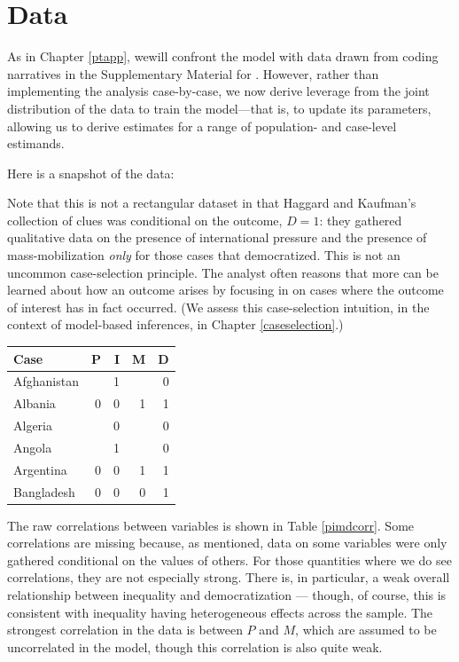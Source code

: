 \documentclass[
  12pt,
]{book}
\begin{document}
\hypertarget{data}{%
\section{Data}\label{data}}

As in Chapter \ref{ptapp}, wewill confront the model with data drawn from coding narratives in the Supplementary Material for \citet{haggard2012inequality}. However, rather than implementing the analysis case-by-case, we now derive leverage from the joint distribution of the data to train the model---that is, to update its parameters, allowing us to derive estimates for a range of population- and case-level estimands.

Here is a snapshot of the data:

Note that this is not a rectangular dataset in that Haggard and Kaufman's collection of clues was conditional on the outcome, \(D=1\): they gathered qualitative data on the presence of international pressure and the presence of mass-mobilization \emph{only} for those cases that democratized. This is not an uncommon case-selection principle. The analyst often reasons that more can be learned about how an outcome arises by focusing in on cases where the outcome of interest has in fact occurred. (We assess this case-selection intuition, in the context of model-based inferences, in Chapter \ref{caseselection}.)

\begin{tabular}{l|r|r|r|r}
\hline
Case & P & I & M & D\\
\hline
Afghanistan &  & 1 &  & 0\\
\hline
Albania & 0 & 0 & 1 & 1\\
\hline
Algeria &  & 0 &  & 0\\
\hline
Angola &  & 1 &  & 0\\
\hline
Argentina & 0 & 0 & 1 & 1\\
\hline
Bangladesh & 0 & 0 & 0 & 1\\
\hline
\end{tabular}

The raw correlations between variables is shown in Table \ref{pimdcorr}. Some correlations are missing because, as mentioned, data on some variables were only gathered conditional on the values of others. For those quantities where we do see correlations, they are not especially strong. There is, in particular, a weak overall relationship between inequality and democratization --- though, of course, this is consistent with inequality having heterogeneous effects across the sample. The strongest correlation in the data is between \(P\) and \(M\), which are assumed to be uncorrelated in the model, though this correlation is also quite weak.
\end{document}
